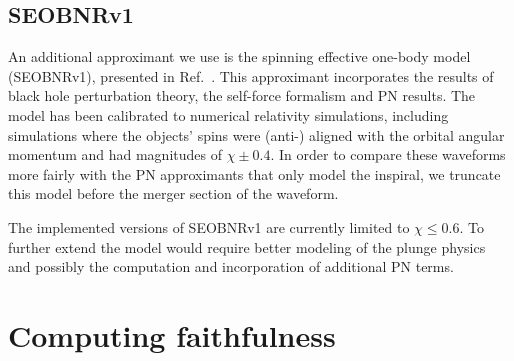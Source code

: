 %

\subsection{SEOBNRv1}

An additional approximant we use is the spinning effective one-body model
(SEOBNRv1), presented in Ref.~\cite{Taracchini:2012ig}.  This approximant
incorporates the results of black hole perturbation theory, the self-force
formalism and \ac{PN} results. The model has been calibrated to numerical
relativity simulations, including simulations where the objects' spins were
(anti-) aligned with the orbital angular momentum and had magnitudes of $\chi
\pm 0.4$.  In order to compare these waveforms more fairly with the \ac{PN}
approximants that only model the inspiral, we truncate this model before the
merger section of the waveform.

The implemented versions of SEOBNRv1 are currently limited to $\chi \leq 0.6$.
To further extend the model would require better modeling of the plunge physics
and possibly the computation and incorporation of additional \ac{PN} terms.

\section{Computing faithfulness}
\label{sec:faithfulness_definition}

